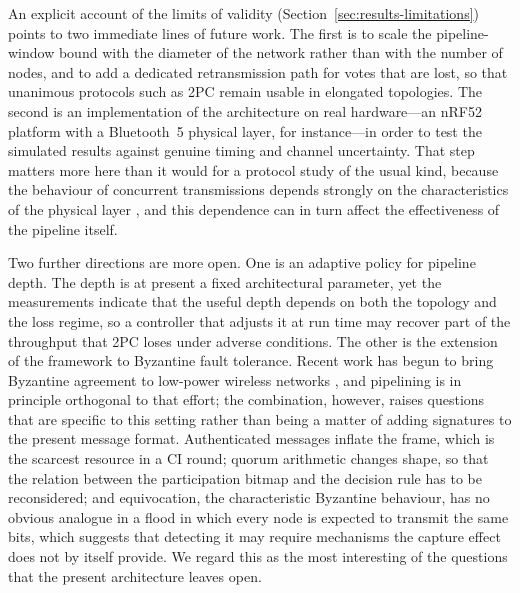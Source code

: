 \documentclass[journal]{IEEEtran}
\newcommand{\CI}{CI}                      %
\begin{document}
An explicit account of the limits of validity
(Section~\ref{sec:results-limitations}) points to two immediate lines of
future work. The first is to scale the pipeline-window bound with the
diameter of the network rather than with the number of nodes, and to add
a dedicated retransmission path for votes that are lost, so that
unanimous protocols such as 2PC remain usable in elongated topologies.
The second is an implementation of the architecture on real
hardware---an nRF52 platform with a Bluetooth~5 physical layer, for
instance---in order to test the simulated results against genuine timing
and channel uncertainty. That step matters more here than it would for a
protocol study of the usual kind, because the behaviour of concurrent
transmissions depends strongly on the characteristics of the physical
layer \cite{baddeley20phy}, and this dependence can in turn affect the
effectiveness of the pipeline itself.

Two further directions are more open. One is an adaptive policy for
pipeline depth. The depth is at present a fixed architectural parameter,
yet the measurements indicate that the useful depth depends on both the
topology and the loss regime, so a controller that adjusts it at run time
may recover part of the throughput that 2PC loses under adverse
conditions. The other is the extension of the framework to Byzantine
fault tolerance. Recent work has begun to bring Byzantine agreement to
low-power wireless networks
\cite{goyal22reli,boehm24tinybft,liu25asyncbft}, and pipelining is in
principle orthogonal to that effort; the combination, however, raises
questions that are specific to this setting rather than being a matter of
adding signatures to the present message format. Authenticated messages
inflate the frame, which is the scarcest resource in a \CI{} round;
quorum arithmetic changes shape, so that the relation between the
participation bitmap and the decision rule has to be reconsidered; and
equivocation, the characteristic Byzantine behaviour, has no obvious
analogue in a flood in which every node is expected to transmit the same
bits, which suggests that detecting it may require mechanisms the capture
effect does not by itself provide. We regard this as the most interesting
of the questions that the present architecture leaves open.


\end{document}

